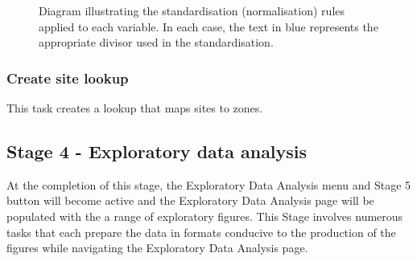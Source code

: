 \documentclass[
  8pt,
  a4paper]{article}
\begin{document}
\begin{figure}


\caption{\label{fig-standardisations}Diagram illustrating the
standardisation (normalisation) rules applied to each variable. In each
case, the text in blue represents the appropriate divisor used in the
standardisation.}

\end{figure}%

\subsubsection{Create site lookup}\label{create-site-lookup}

This task creates a lookup that maps sites to zones.

\subsection{Stage 4 - Exploratory data
analysis}\label{stage-4---exploratory-data-analysis}

At the completion of this stage, the Exploratory Data Analysis menu and
Stage 5 button will become active and the Exploratory Data Analysis page
will be populated with the a range of exploratory figures. This Stage
involves numerous tasks that each prepare the data in formats conducive
to the production of the figures while navigating the Exploratory Data
Analysis page.
\end{document}
